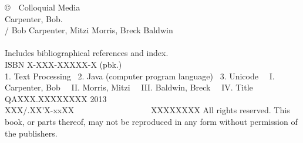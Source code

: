 \clearpage
\pagestyle{empty}
\vspace*{1.25in}
\noindent
{\footnotesize%
\copyright \ \ Colloquial Media
\hfill
\vfill
\vfill
{}
\\[6pt]
Carpenter, Bob.
\\
\hspace*{0.125in}{\it Text Processing with Java} / Bob
Carpenter, Mitzi Morris, Breck Baldwin
\\
\hspace*{.5in}{p. cm.}
\\
\hspace*{0.125in}Includes bibliographical references and index.
\\
\hspace*{0.125in}ISBN X-XXX-XXXXX-X (pbk.)
\\[4pt]
1. Text Processing  \ 2. Java (computer program language) \ 3. Unicode
\ \ I. Carpenter, Bob \ \ II. Morris, Mitzi \ \ III. Baldwin, Breck \ \ IV. Title
\\[2pt]
\hspace*{0.125in}QAXXX.XXXXXXXX 2013
\\[2pt]
\hspace*{0.125in}XXX/.XX'X-xxXX      \ \ \ \ \ \ \ \ \ \ \ \ \ \ \ \ \  \ XXXXXXXX
\vfill
All rights reserved. This book, or parts thereof, may not
be reproduced in any form without permission of the publishers.
}

